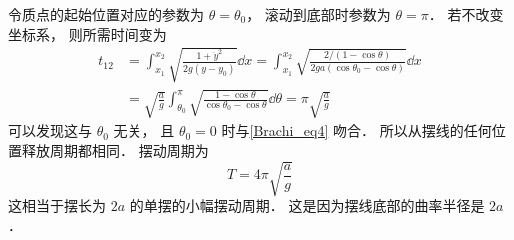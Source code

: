 令质点的起始位置对应的参数为 $\theta = \theta_0$， 滚动到底部时参数为 $\theta = \pi$．
若不改变坐标系， 则所需时间变为
\begin{equation}
\begin{aligned}
t_{12} &= \int_{x_1}^{x_2} \sqrt{\frac{1 + \dot{y}^2}{2g(y - y_0)}} \dd{x}
= \int_{x_1}^{x_2} \sqrt{\frac{2/(1 - \cos\theta)}{2ga(\cos\theta_0 - \cos\theta)}} \dd{x}\\
&= \sqrt{\frac{a}{g}}\int_{\theta_0}^{\pi} \sqrt{\frac{1 - \cos\theta}{\cos\theta_0 - \cos\theta}} \dd{\theta}
= \pi\sqrt{\frac{a}{g}}
\end{aligned}
\end{equation}
可以发现这与 $\theta_0$ 无关， 且 $\theta_0 = 0$ 时与\autoref{Brachi_eq4} 吻合． 所以从摆线的任何位置释放周期都相同． 摆动周期为
\begin{equation}
T = 4\pi\sqrt{\frac{a}{g}}
\end{equation}
这相当于摆长为 $2a$ 的单摆的小幅摆动周期． 这是因为摆线底部的曲率半径是 $2a$．
